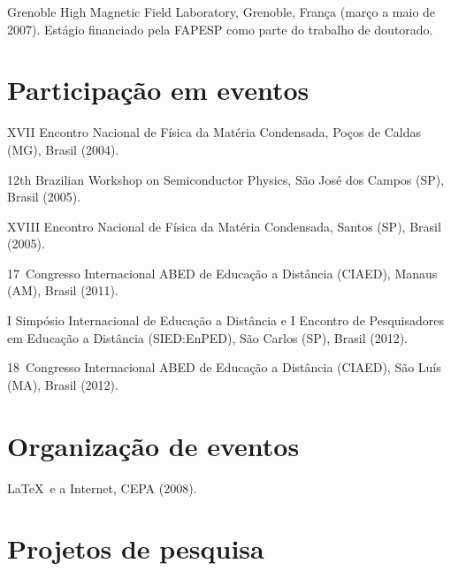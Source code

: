 \begin{compactitem}
	\item Grenoble High Magnetic Field Laboratory, Grenoble, França (março a maio de 2007). Estágio financiado pela FAPESP como parte do trabalho de doutorado.
\end{compactitem}


\section*{Participação em eventos}

\begin{compactitem}
	\item XVII Encontro Nacional de Física da Matéria Condensada, Poços de Caldas (MG), Brasil (2004).
	\item 12th Brazilian Workshop on Semiconductor Physics, São José dos Campos (SP), Brasil (2005).
	\item XVIII Encontro Nacional de Física da Matéria Condensada, Santos (SP), Brasil (2005).
	\item 17\textordmasculine\ Congresso Internacional ABED de Educação a Distância (CIAED), Manaus (AM), Brasil (2011).
	\item I Simpósio Internacional de Educação a Distância e I Encontro de Pesquisadores em Educação a Distância (SIED:EnPED), São Carlos (SP), Brasil (2012).
	\item 18\textordmasculine\ Congresso Internacional ABED de Educação a Distância (CIAED), São Luís (MA), Brasil (2012).
\end{compactitem}

\section*{Organização de eventos}

\begin{compactitem}
	\item \LaTeX\ e a Internet, CEPA (2008).
\end{compactitem}

\section*{Projetos de pesquisa}

